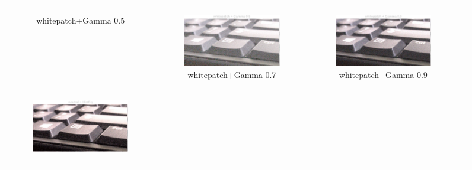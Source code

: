\documentclass[11pt, a4]{article}
\begin{document}
\begin{enumerate}
\begin{figure}[H]
{\begin{tabular}{cccc}
\begin{subfigure}[h]{0.45\linewidth}
							\caption{whitepatch+Gamma 0.5}
							\label{fig:RawImage2_tone_6}
						\end{subfigure} &
						\begin{subfigure}[h]{0.45\linewidth}
							\centering
							\includegraphics[width=\linewidth]{../output/RawImage2_Tone_whitepatch_Gamma0.5.pdf}
							\caption{whitepatch+Gamma 0.7}
							\label{fig:RawImage2_tone_7}
						\end{subfigure} &
						\begin{subfigure}[h]{0.45\linewidth}
							\centering
							\includegraphics[width=\linewidth]{../output/RawImage2_Tone_whitepatch_Gamma0.9.pdf}
							\caption{whitepatch+Gamma 0.9}
							\label{fig:RawImage2_tone_8}
						\end{subfigure}\\
						\begin{subfigure}[h]{0.45\linewidth}
							\centering
							\includegraphics[width=\linewidth]{../output/RawImage2_Tone_neutral_HistEq.pdf}

\end{subfigure}
\end{tabular}}
\end{figure}
\end{enumerate}
\end{document}
